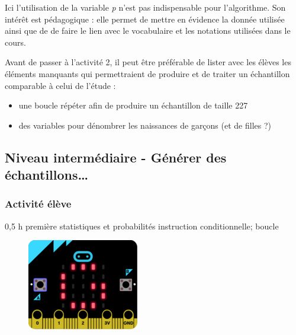 \begin{remarque}
    Ici l'utilisation de la variable \emph{p} n'est pas indispensable pour l'algorithme. Son intérêt est pédagogique : elle permet de mettre en évidence la donnée utilisée ainsi que de de faire le lien avec le vocabulaire et les notations utilisées dans le cours.

   Avant de passer à l'activité 2, il peut être préférable de lister avec les élèves les éléments manquants qui permettraient de produire et de traiter un échantillon comparable à celui de l'étude :
   \begin{itemize}
       \item une boucle répéter afin de produire un échantillon de taille 227
       \item des variables pour dénombrer les naissances de garçons (et de filles ?)
   \end{itemize}
\end{remarque}

%
%

\newpage

\subsection{Niveau intermédiaire - Générer des échantillons\ldots}

\subsubsection{Activité élève}

\cartouche
{0,5 h}         %
{première}           %
{statistiques et probabilités}        %
{}     %
{instruction conditionnelle; boucle}       %


\begin{figure}
    \includegraphics[width=\linewidth]{res/mb-fluctuations-illustration.png}
\end{figure}

